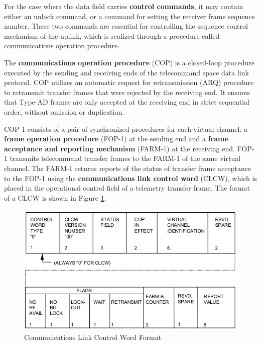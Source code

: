 For the case where the data field carries \textbf{control commands}, it may contain either  an unlock command, or a command for setting the receiver frame sequence number. These two commands are essential for controlling the sequence control mechanism of the uplink, which is realized through a procedure called communications operation procedure.

The \textbf{communications operation procedure} (COP) is a closed-loop procedure executed by the sending and receiving ends of the telecommand space data link protocol. COP utilizes an automatic request for retransmission (ARQ) procedure to retransmit transfer frames that were rejected by the receiving end. It ensures that Type-AD frames are only accepted at the receiving end in strict sequential order, without omission or duplication. 

COP-1 consists of a pair of synchronized procedures for each virtual channel: a \textbf{frame operation procedure} (FOP-1) at the sending end and a \textbf{frame acceptance and reporting mechanism} (FARM-1) at the receiving end. FOP-1 transmits telecommand transfer frames to the FARM-1 of the same virtual channel. The FARM-1 returns reports of the status of transfer frame acceptance to the FOP-1 using the \textbf{communications link control word} (CLCW), which is placed in the operational control field of a telemetry transfer frame. The format of a CLCW is shown in Figure \ref{fig:Communications Link Control Word Format}.

\begin{figure}[h]
\centering\includegraphics[scale=0.6]{fig/communications_link_control_word_format}
\caption{Communications Link Control Word Format}
\label{fig:Communications Link Control Word Format}
\end{figure}

